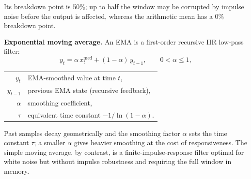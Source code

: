 \vspace{0.5em}
Its breakdown point is 50\%; up to half the window may be corrupted by impulse noise before the output is affected, whereas the arithmetic mean has a 0\% breakdown point.

\textbf{Exponential moving average.} An EMA is a first-order recursive IIR low-pass filter:
%
\begin{equation}
y_t = \alpha\, x_t^{\mathrm{med}} + (1 - \alpha)\, y_{t-1}, \qquad 0 < \alpha \leq 1,
\label{eq:ema-ch3}
\end{equation}
\begin{tabular}{@{}r@{~=~}l@{}}
$y_t$ & EMA-smoothed value at time $t$, \\
$y_{t-1}$ & previous EMA state (recursive feedback), \\
$\alpha$ & smoothing coefficient, \\
$\tau$ & equivalent time constant $-1/\ln(1-\alpha)$.
\end{tabular}

\vspace{0.5em}
Past samples decay geometrically and the smoothing factor $\alpha$ sets the time constant $\tau$; a smaller $\alpha$ gives heavier smoothing at the cost of responsiveness. The simple moving average, by contrast, is a finite-impulse-response filter optimal for white noise but without impulse robustness and requiring the full window in memory.

